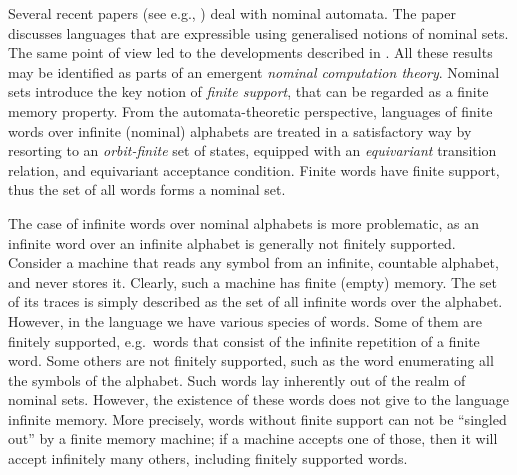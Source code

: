 Several recent papers (see e.g., \cite{Tze11,KST12,GC11}) deal with nominal automata. The paper \cite{BojanczykKL11} discusses languages that are expressible using generalised notions of nominal sets. The same point of view led to the developments described in \cite{BBKL12,LP13,BKLT13}. All these results may be identified as parts of an emergent
\emph{nominal computation theory}. Nominal sets introduce the key notion of \emph{finite support}, that can be regarded as a finite memory property. From the automata-theoretic perspective, languages of finite words over infinite (nominal) alphabets are treated in a satisfactory way by resorting to an \emph{orbit-finite} set of states, equipped with an \emph{equivariant} transition relation, and equivariant acceptance condition. Finite words have finite support, thus the set of all words forms a nominal set. 

The case of infinite words over nominal alphabets is more problematic, as an infinite word over an infinite alphabet is generally not finitely supported. Consider a machine that reads any symbol from an infinite, countable alphabet, and never stores it. Clearly, such a machine has finite (empty) memory. The set of its traces is simply described as the set of all infinite words over the alphabet. However, in the language we have various species of words. Some of them are finitely supported, e.g.\ words that consist of the infinite repetition of a finite word. Some others are not finitely supported, such as the word enumerating all the symbols of the alphabet. Such words lay inherently out of the realm of nominal sets. However, the existence of these words does not give to the language infinite memory. More precisely,  words without finite support can not be ``singled out'' by a finite memory machine; if a machine accepts one of those, then it will accept infinitely many others, including finitely supported words.  

